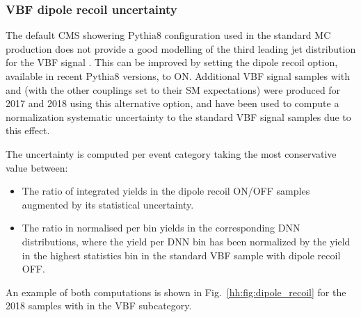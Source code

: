 \documentclass[../main.tex]{subfiles}
\begin{document}
\subsubsection*{VBF dipole recoil uncertainty}

The default CMS showering Pythia8 configuration used in the standard MC production does not provide a good modelling of the third leading jet distribution for the VBF signal \cite{hh:results:dipole_recoil}. This can be improved by setting the dipole recoil option, available in recent Pythia8 versions, to ON. Additional VBF signal samples with  and  (with the other couplings set to their SM expectations) were produced for 2017 and 2018 using this alternative option, and have been used to compute a normalization systematic uncertainty to the standard VBF signal samples due to this effect.

The uncertainty is computed per event category taking the most conservative value between:
\begin{itemize}
\item The ratio of integrated yields in the dipole recoil ON/OFF samples augmented by its statistical uncertainty.
\item The ratio in normalised per bin yields in the corresponding DNN distributions, where the yield per DNN bin has been normalized by the yield in the highest statistics bin in the standard VBF sample with dipole recoil OFF.
\end{itemize}

An example of both computations is shown in Fig.~\ref{hh:fig:dipole_recoil} for the 2018 samples with  in the VBF subcategory.
\end{document}
